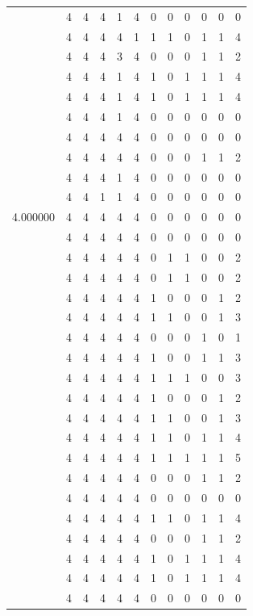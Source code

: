 \documentclass[]{book}
\theoremstyle{definition}
\theoremstyle{definition}
\theoremstyle{definition}
\theoremstyle{remark}
\begin{document}
\begin{table}
{\begin{tabular}[t]{rrrrrrrrrrrr}
 & 4 & 4 & 4 & 1 & 4 & 0 & 0 & 0 & 0 & 0 & 0\\
 & 4 & 4 & 4 & 4 & 1 & 1 & 1 & 0 & 1 & 1 & 4\\
 & 4 & 4 & 4 & 3 & 4 & 0 & 0 & 0 & 1 & 1 & 2\\
 & 4 & 4 & 4 & 1 & 4 & 1 & 0 & 1 & 1 & 1 & 4\\
 & 4 & 4 & 4 & 1 & 4 & 1 & 0 & 1 & 1 & 1 & 4\\
 & 4 & 4 & 4 & 1 & 4 & 0 & 0 & 0 & 0 & 0 & 0\\
 & 4 & 4 & 4 & 4 & 4 & 0 & 0 & 0 & 0 & 0 & 0\\
 & 4 & 4 & 4 & 4 & 4 & 0 & 0 & 0 & 1 & 1 & 2\\
 & 4 & 4 & 4 & 1 & 4 & 0 & 0 & 0 & 0 & 0 & 0\\
 & 4 & 4 & 1 & 1 & 4 & 0 & 0 & 0 & 0 & 0 & 0\\
4.000000 & 4 & 4 & 4 & 4 & 4 & 0 & 0 & 0 & 0 & 0 & 0\\
 & 4 & 4 & 4 & 4 & 4 & 0 & 0 & 0 & 0 & 0 & 0\\
 & 4 & 4 & 4 & 4 & 4 & 0 & 1 & 1 & 0 & 0 & 2\\
 & 4 & 4 & 4 & 4 & 4 & 0 & 1 & 1 & 0 & 0 & 2\\
 & 4 & 4 & 4 & 4 & 4 & 1 & 0 & 0 & 0 & 1 & 2\\
 & 4 & 4 & 4 & 4 & 4 & 1 & 1 & 0 & 0 & 1 & 3\\
 & 4 & 4 & 4 & 4 & 4 & 0 & 0 & 0 & 1 & 0 & 1\\
 & 4 & 4 & 4 & 4 & 4 & 1 & 0 & 0 & 1 & 1 & 3\\
 & 4 & 4 & 4 & 4 & 4 & 1 & 1 & 1 & 0 & 0 & 3\\
 & 4 & 4 & 4 & 4 & 4 & 1 & 0 & 0 & 0 & 1 & 2\\
 & 4 & 4 & 4 & 4 & 4 & 1 & 1 & 0 & 0 & 1 & 3\\
 & 4 & 4 & 4 & 4 & 4 & 1 & 1 & 0 & 1 & 1 & 4\\
 & 4 & 4 & 4 & 4 & 4 & 1 & 1 & 1 & 1 & 1 & 5\\
 & 4 & 4 & 4 & 4 & 4 & 0 & 0 & 0 & 1 & 1 & 2\\
 & 4 & 4 & 4 & 4 & 4 & 0 & 0 & 0 & 0 & 0 & 0\\
 & 4 & 4 & 4 & 4 & 4 & 1 & 1 & 0 & 1 & 1 & 4\\
 & 4 & 4 & 4 & 4 & 4 & 0 & 0 & 0 & 1 & 1 & 2\\
 & 4 & 4 & 4 & 4 & 4 & 1 & 0 & 1 & 1 & 1 & 4\\
 & 4 & 4 & 4 & 4 & 4 & 1 & 0 & 1 & 1 & 1 & 4\\
 & 4 & 4 & 4 & 4 & 4 & 0 & 0 & 0 & 0 & 0 & 0\\

\end{tabular}}
\end{table}
\end{document}
